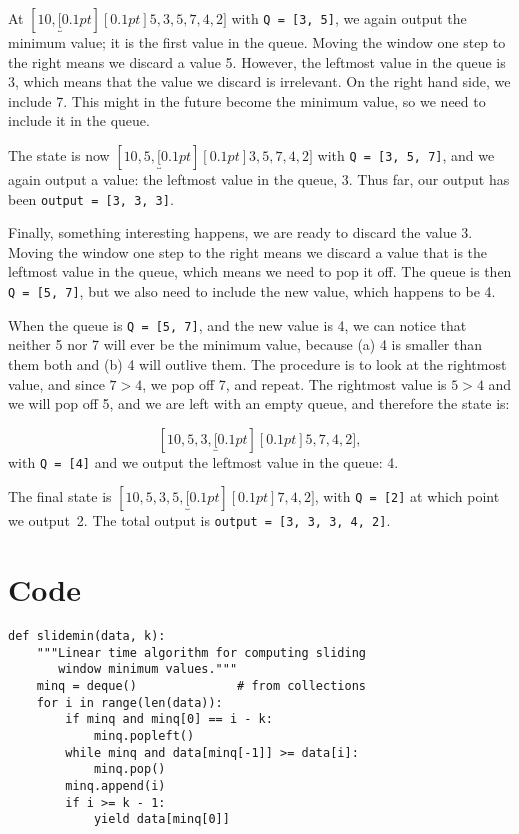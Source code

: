 \documentclass[a4paper,12pt]{article}
\newcommand{\window}[1]{\underbracket[0.1pt][0.1pt]{#1}}
\begin{document}
At $[10, \window{ 5, 3, 5 }, 7, 4, 2]$ with
%
\texttt{Q = [3, 5]},
%
we again output the minimum value; it is the first value in the queue.
%
Moving the window one step to the right means we discard a value 5.  However,
the leftmost value in the queue is 3, which means that the value we discard is
irrelevant.  On the right hand side, we include 7.  This might in the future
become the minimum value, so we need to include it in the queue.

The state is now $[10, 5, \window{ 3, 5, 7}, 4, 2]$ with
%
\texttt{Q = [3, 5, 7]}, and we again output a value: the leftmost
value in the queue, 3.  Thus far, our output has been
%
\texttt{output = [3, 3, 3]}.

Finally, something interesting happens, we are ready to discard the value 3.
Moving the window one step to the right means we discard a value that is the
leftmost value in the queue, which means we need to pop it off.  The queue is
then
%
\texttt{Q = [5, 7]},
%
but we also need to include the new value, which happens to be 4.

When the queue is \texttt{Q = [5, 7]}, and the new value is 4, we
can notice that neither 5 nor 7 will ever be the minimum value, because (a) 4 is smaller
than them both and (b) 4 will outlive them.  The procedure is to look at the
rightmost value, and since $7 > 4$, we pop off 7, and repeat.  The rightmost
value is $5 > 4$ and we will pop off 5, and we are left with an empty queue,
and therefore the state is:

$$[10, 5 ,3, \window{ 5, 7, 4 },  2],$$
with
%
\texttt{Q = [4]}
%
and we output the leftmost value in the queue: 4.

The final state is $[10, 5 ,3 ,5, \window{ 7, 4 , 2 }]$, with
%
\texttt{Q = [2]}
%
at which point we output~2.  The total output is
%
\texttt{output = [3, 3, 3, 4, 2]}.
%

\appendix
\section*{Code}

\begin{verbatim}
def slidemin(data, k):
    """Linear time algorithm for computing sliding
       window minimum values."""
    minq = deque()              # from collections
    for i in range(len(data)):
        if minq and minq[0] == i - k:
            minq.popleft()
        while minq and data[minq[-1]] >= data[i]:
            minq.pop()
        minq.append(i)
        if i >= k - 1:
            yield data[minq[0]]
\end{verbatim}
\end{document}
